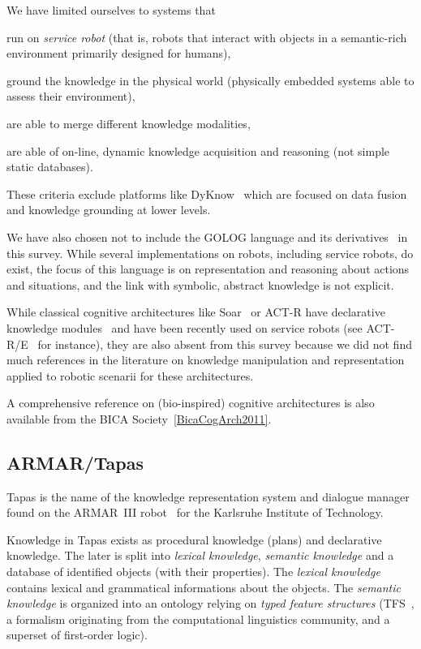 We have limited ourselves to systems that
\begin{inparaenum} 
    \item  run on \emph{service robot} (that is, robots that interact with 
    objects in a semantic-rich environment primarily designed for humans),
    \item  ground the knowledge in the physical world (physically embedded
    systems able to assess their environment),
    \item  are able to merge different knowledge modalities,
    \item  are able of on-line, dynamic knowledge acquisition and reasoning 
    (\ie not simple static databases).
\end{inparaenum}

These criteria exclude platforms like {\sc DyKnow}~\cite{Heintz2004}
which are focused on data fusion and knowledge grounding at lower levels.

We have also chosen not to include the GOLOG language and its
derivatives~\cite{Levesque1997, Ferrein2008, Gspandl2011} in this survey. While
several implementations on robots, including service robots, do exist, the
focus of this language is on representation and reasoning about actions and
situations, and the link with symbolic, abstract knowledge is not explicit.

While classical cognitive architectures like {\sc Soar}~\cite{Lehman2006} or
{\sc ACT-R} have declarative knowledge modules~\cite{Derbinsky2010} and have
been recently used on service robots (see {\sc ACT-R/E}~\cite{Kennedy2009} for
instance), they are also absent from this survey because we did not find much
references in the literature on knowledge manipulation and representation
applied to robotic scenarii for these architectures.

A comprehensive reference on (bio-inspired) cognitive architectures is also
available from the BICA Society~\ref{BicaCogArch2011}.

\subsection{ARMAR/Tapas}

{\sc Tapas} is the name of the knowledge representation system and dialogue
manager found on the ARMAR~III robot~\cite{Holzapfel2008} for the Karlsruhe
Institute of Technology.

Knowledge in {\sc Tapas} exists as procedural knowledge (plans) and declarative
knowledge. The later is split into \emph{lexical knowledge}, \emph{semantic
knowledge} and a database of identified objects (with their properties). The
\emph{lexical knowledge} contains lexical and grammatical informations about
the objects. The \emph{semantic knowledge} is organized into an ontology
relying on \emph{typed feature structures} (TFS~\cite{Carpenter1992}, a
formalism originating from the computational linguistics community, and a
superset of first-order logic).

